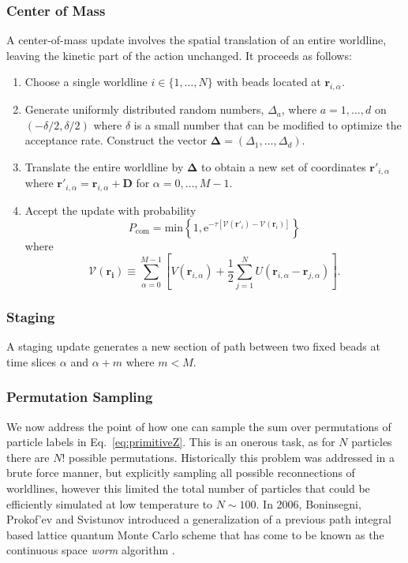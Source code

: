 \documentclass[prb,aps,amssym,nofootinbib,floatfix,notitlepage]{revtex4-1}
\renewcommand{\vec}[1]{\boldsymbol{#1}}
\newcommand{\e}[1]{\mathrm{e}^{#1}}
\begin{document}
\subsubsection{Center of Mass}
A center-of-mass update involves the spatial translation of an entire
worldline, leaving the kinetic part of the action unchanged.  It proceeds as
follows:
\begin{enumerate}
    \item Choose a single worldline $i \in \{1,\ldots,N\}$ with beads located
        at $\vec{r}_{i,\alpha}$.
    \item Generate uniformly distributed random numbers, $\Delta_a$, where
        $a=1,\ldots,d$ on $(-\delta/2,\delta/2)$ where $\delta$ is a small number that can be
    modified to optimize the acceptance rate. Construct the vector $\vec{\Delta} =
    (\Delta_1,\ldots,\Delta_d)$.
\item Translate the entire worldline by $\vec{\Delta}$ to obtain a new set of
coordinates $\vec{r}'_{i,\alpha}$ where  $\vec{r}'_{i,\alpha} =
\vec{r}_{i,\alpha} + \vec{D}$ for $\alpha = 0,\ldots,M-1$.
\item Accept the update with probability
\begin{equation}
    P_{\text{com}} = \mathrm{min} 
    \left\{1,\e{-\tau[\mathcal{V}(\vec{r}'_i)-\mathcal{V}(\vec{r}_i)]} \right\}
\end{equation}
%
where 
%
\begin{equation}
    \mathcal{V}(\vec{r_i}) \equiv \sum_{\alpha=0}^{M-1}\left[ V(\vec{r}_{i,\alpha}) + \frac{1}{2}\sum_{j=1}^{N}
    U(\vec{r}_{i,\alpha}-\vec{r}_{j,\alpha})\right].
\end{equation}
%
\end{enumerate}

\subsubsection{Staging}
A staging update \cite{Sprik:1985bz} generates a new section of path between two fixed beads at time
slices $\alpha$ and $\alpha+m$ where $m < M$.

\subsubsection{Permutation Sampling}
We now address the point of how one can sample the sum over permutations of
particle labels in Eq.~\ref{eq:primitiveZ}. This is an onerous task, as for $N$
particles there are $N!$ possible permutations.  Historically this problem was
addressed in a brute force manner, but explicitly sampling all possible
reconnections of worldlines, however this limited the total number of
particles that could be efficiently simulated at low temperature to $N \sim
100$. In 2006, Boninsegni, Prokof'ev and Svistunov introduced a generalization
of a previous path integral based lattice quantum Monte Carlo scheme
\cite{Prokofev:1998ux} that has come to be known as the continuous space
\emph{worm} algorithm \cite{Boninsegni:2006ed,Boninsegni:2006gc}.
\end{document}
